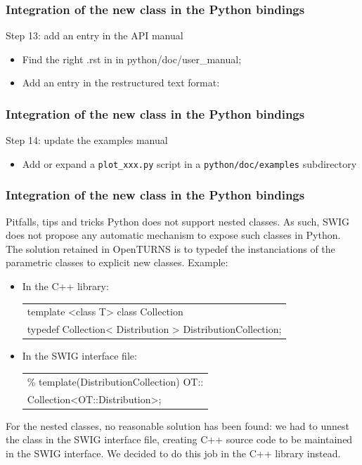 \documentclass[8pt]{beamer}
\begin{document}
\begin{frame}[containsverbatim]
  \frametitle{Integration of the new class in the Python bindings}
  \begin{block}{Step 13: add an entry in the API manual}
    \begin{itemize}
    \item Find the right .rst in in python/doc/user\_manual;
    \item Add an entry in the restructured text format:
    \end{itemize}
  \end{block}
\end{frame}
\begin{frame}[containsverbatim]
  \frametitle{Integration of the new class in the Python bindings}
  \begin{block}{Step 14: update the examples manual}    
    \begin{itemize}
    \item Add or expand a \texttt{plot\_xxx.py} script in a \texttt{python/doc/examples} subdirectory
    \end{itemize}
  \end{block}
\end{frame}
\begin{frame}
  \frametitle{Integration of the new class in the Python bindings}
  \begin{block}{Pitfalls, tips and tricks}
    Python does not support nested classes. As such, SWIG does  not propose any automatic mechanism to expose such classes in Python. The solution retained in OpenTURNS is to typedef the instanciations of the parametric classes to explicit new classes. Example:
    \begin{itemize}
    \item In the C++ library:
      \small
      \begin{tabular}{l}
        \ttfamily template <class T> class Collection \\
        \ttfamily typedef Collection< Distribution > DistributionCollection;
      \end{tabular}
      \normalsize
    \item In the SWIG interface file:
      \small
      \begin{tabular}{l}
        \ttfamily \% template(DistributionCollection) OT::\\
        \ttfamily Collection<OT::Distribution>;
      \end{tabular}
      \normalsize
    \end{itemize}
    For the nested classes, no reasonable solution has been found: we had to unnest the class in the SWIG interface file, creating C++ source code to be maintained in the SWIG interface. We decided to do this job in the C++ library instead.
  \end{block}
\end{frame}
\end{document}
